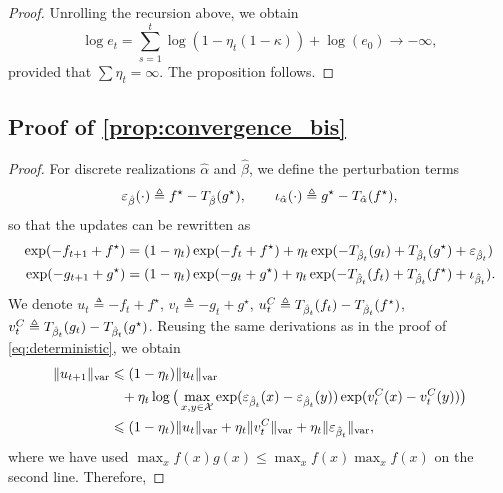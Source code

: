 \begin{proof}
    Unrolling the recursion above, we obtain
    \begin{equation}
        \log e_t = \sum_{s=1}^t \log(1 - \eta_t (1 - \kappa)) + \log(e_0) \to - \infty,
    \end{equation}
    provided that $\sum \eta_t = \infty$. The proposition follows.
\end{proof}

\subsection{Proof of \autoref{prop:convergence_bis}}

\begin{proof}
For discrete realizations $\hat \alpha$ and $\hat \beta$, we define the perturbation terms
\begin{equation}
    \epsilon_{\hat \beta}(\cdot) \triangleq
    f^\star - \Ctrans{g^\star}{\hat \beta} ,\qquad
    \iota_{\hat \alpha}(\cdot) \triangleq 
    g^\star - \Ctrans{f^\star}{\hat \alpha},
\end{equation}
so that the updates can be rewritten as
\begin{align}
    \exp(-f_{t+1} + f^\star) &= (1 - \eta_t)
    \exp(-f_{t} + f^\star)
    + \eta_t \exp(-\Ctrans{g_t}{\hat \beta_t} 
    +\Ctrans{g^\star}{\hat \beta_t} + \epsilon_{\hat \beta_t}) \\
    \exp(-g_{t+1} + g^\star) &= (1 - \eta_t)
    \exp(-g_{t} + g^\star)
    + \eta_t \exp(-\Ctrans{f_t}{\hat \beta_t} 
    +\Ctrans{f^\star}{\hat \beta_t} + \iota_{\hat \beta_t}).
\end{align}
We denote $u_t \triangleq -f_{t} + f^\star$, $v_t \triangleq -g_{t} + g^\star$, $u_t^C \triangleq
\Ctrans{f_t}{\hat \beta_t} - \Ctrans{f^\star}{\hat \beta_t}$, $v_t^C \triangleq
\Ctrans{g_t}{\hat \beta_t} - \Ctrans{g^\star}{\hat \beta_t}$. Reusing the same
derivations as in the proof of \autoref{eq:deterministic}, we obtain
    \label{eq:pre_ineq_var}
    \begin{align}
    \Vert u_{t+1} \Vert_{\var} &\leq
    (1 - \eta_t) \Vert u_t \Vert_{\var}
    \\
    &\phantom{=}+ \eta_t \log \big( \max_{x, y \in \Xx}
    \exp(\epsilon_{\hat \beta_t}(x) 
    - \epsilon_{\hat \beta_t}(y)) \exp(v_t^C(x) - v_t^C(y)) \big) \\ 
    &\leq
    (1 - \eta_t) \Vert u_t \Vert_{\var}
    + \eta_t \Vert v_t^C \Vert_{\var}
    + \eta_t \Vert \epsilon_{\hat \beta_t} \Vert_{\var},
\end{align}
where we have used $\max_x f(x) g(x) \leq \max_x f(x) \max_x f(x)$ on the second line. Therefore,

\end{proof}
